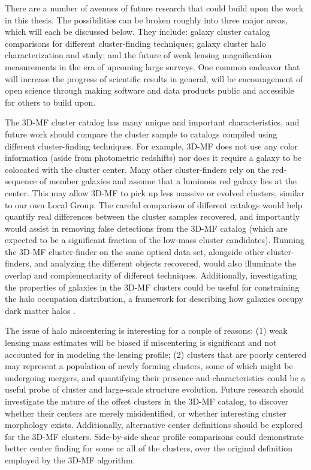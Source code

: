 There are a number of avenues of future research that could build upon the work in this thesis. The possibilities can be broken roughly into three major areas, which will each be discussed below. They include: galaxy cluster catalog comparisons for different cluster-finding techniques; galaxy cluster halo characterization and study; and the future of weak lensing magnification measurements in the era of upcoming large surveys. One common endeavor that will increase the progress of scientific results in general, will be encouragement of open science through making software and data products public and accessible for others to build upon.

The \ac{3D-MF} cluster catalog has many unique and important characteristics, and future work should compare the cluster sample to catalogs compiled using different cluster-finding techniques. For example, \ac{3D-MF} does not use any color information (aside from photometric redshifts) nor does it require a galaxy to be colocated with the cluster center. Many other cluster-finders rely on the red-sequence of member galaxies and assume that a luminous red galaxy lies at the center. This may allow \ac{3D-MF} to pick up less massive or evolved clusters, similar to our own Local Group. The careful comparison of different catalogs would help quantify real differences between the cluster samples recovered, and importantly would assist in removing false detections from the \ac{3D-MF} catalog (which are expected to be a significant fraction of the low-mass cluster candidates). Running the \ac{3D-MF} cluster-finder on the same optical data set, alongside other cluster-finders, and analyzing the different objects recovered, would also illuminate the overlap and complementarity of different techniques. Additionally, investigating the properties of galaxies in the \ac{3D-MF} clusters could be useful for constraining the halo occupation distribution, a framework for describing how galaxies occupy dark matter halos \citep{Coupon15}.

The issue of halo miscentering is interesting for a couple of reasons: (1) weak lensing mass estimates will be biased if miscentering is significant and not accounted for in modeling the lensing profile; (2) clusters that are poorly centered may represent a population of newly forming clusters, some of which might be undergoing mergers, and quantifying their presence and characteristics could be a useful probe of cluster and large-scale structure evolution. Future research should investigate the nature of the offset clusters in the \ac{3D-MF} catalog, to discover whether their centers are merely misidentified, or whether interesting cluster morphology exists. Additionally, alternative center definitions should be explored for the \ac{3D-MF} clusters. Side-by-side shear profile comparisons could demonstrate better center finding for some or all of the clusters, over the original definition employed by the \ac{3D-MF} algorithm.


